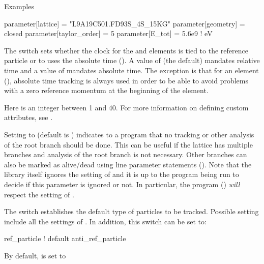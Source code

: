 \noindent
Examples
\begin{example}
  parameter[lattice]      = "L9A19C501.FD93S_4S_15KG"
  parameter[geometry]     = closed
  parameter[taylor_order] = 5
  parameter[E_tot]        = 5.6e9    ! eV
\end{example}

  \begin{description}
  \item[{parameter[absolute_time_tracking]}] \Newline
The  switch sets whether the clock for the  and
 elements is tied to the reference particle or to uses the absolute time
(). A value of  (the default) mandates relative time and a value
of  mandates absolute time. The exception is that for an  element
(), absolute time tracking is always used in order to be able to avoid
problems with a zero reference momentum at the beginning of the element.
  \item[{parameter[custom_attributeN]}] \Newline
Here  is an integer between 1 and 40.
For more information on defining custom attributes, see .
  \item[{parameter[live_branch}] \Newline
Setting  to  (default is ) indicates to a program that
no tracking or other analysis of the root branch should be done. This can be useful if the
lattice has multiple branches and analysis of the root branch is not necessary. Other
branches can also be marked as alive/dead using line parameter statements
(). Note that the \bmad library itself ignores the setting of
 and it is up to the program being run to decide if this parameter is
ignored or not. In particular, the \tao program () {\em will} respect the
setting of .
  \item[{parameter[default_tracking_species]}] \Newline
The  switch establishes the
default type of particles to be tracked. Possible setting include
all the settings of . In addition, 
this switch can be set to:
\begin{example}
  ref_particle     ! default
  anti_ref_particle
\end{example}
By default,  is set to 

\end{description}
